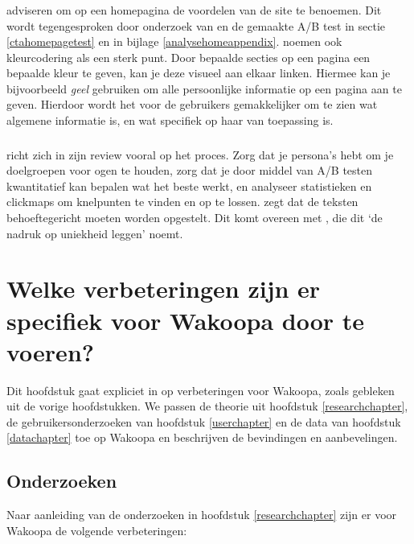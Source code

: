 \documentclass[a4paper, 10pt, pdftex]{report}
\begin{document}
      \subsection{\cite{Hoekman2008}}
        \citeauthor{Hoekman2008} adviseren om op een homepagina de voordelen van de site te benoemen. Dit wordt tegengesproken door onderzoek van \cite{Beenen2004} en de gemaakte A/B test in sectie \ref{ctahomepagetest} en in bijlage \ref{analysehomeappendix}. \citeauthor{Hoekman2008} noemen ook kleurcodering als een sterk punt. Door bepaalde secties op een pagina een bepaalde kleur te geven, kan je deze visueel aan elkaar linken. Hiermee kan je bijvoorbeeld \emph{geel} gebruiken om alle persoonlijke informatie op een pagina aan te geven. Hierdoor wordt het voor de gebruikers gemakkelijker om te zien wat algemene informatie is, en wat specifiek op haar van toepassing is.

      \subsection{\cite{Timmerman2008}}
        \citeauthor{Timmerman2008} richt zich in zijn review vooral op het proces. Zorg dat je persona's hebt om je doelgroepen voor ogen te houden, zorg dat je door middel van A/B testen kwantitatief kan bepalen wat het beste werkt, en analyseer statistieken en clickmaps om knelpunten te vinden en op te lossen. \citeauthor{Timmerman2008} zegt dat de teksten behoeftegericht moeten worden opgestelt. Dit komt overeen met \cite{Beenen2004}, die dit `de nadruk op uniekheid leggen' noemt.

  \newpage
  \chapter{Welke verbeteringen zijn er specifiek voor Wakoopa door te voeren?}
    \newpage

    Dit hoofdstuk gaat expliciet in op verbeteringen voor Wakoopa, zoals gebleken uit de vorige hoofdstukken. We passen de theorie uit hoofdstuk \ref{researchchapter}, de gebruikersonderzoeken van hoofdstuk \ref{userchapter} en de data van hoofdstuk \ref{datachapter} toe op Wakoopa en beschrijven de bevindingen en aanbevelingen.

    \section{Onderzoeken}
    Naar aanleiding van de onderzoeken in hoofdstuk \ref{researchchapter} zijn er voor Wakoopa de volgende verbeteringen:
\end{document}
